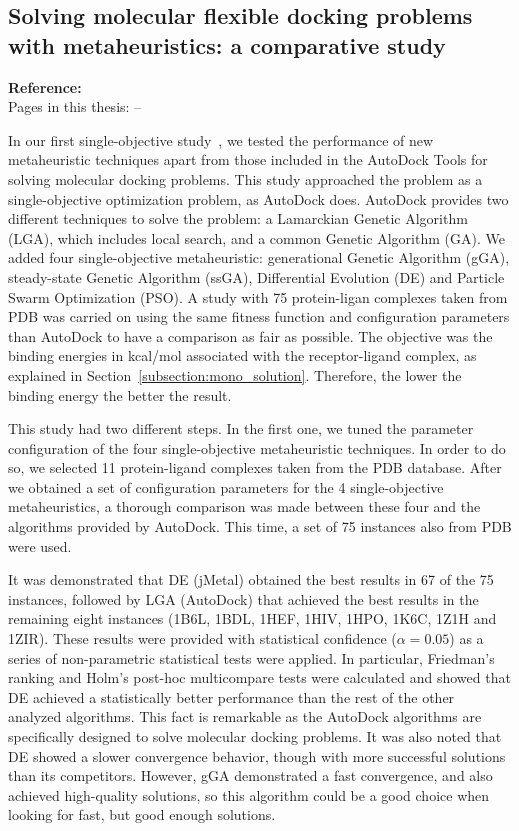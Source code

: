 \subsection{Solving molecular flexible docking problems with metaheuristics: a comparative study}

\textbf{Reference:}~\cite{lopez2015asoc} \\
Pages in this thesis: \pageref{start-pdf/asoc.pdf} -- \pageref{stop-pdf/asoc.pdf}

In our first single-objective study~\cite{lopez2015asoc}, we tested the performance of new metaheuristic techniques apart from those included in the AutoDock Tools for solving molecular docking problems. This study approached the problem as a single-objective optimization problem, as AutoDock does. AutoDock provides two different techniques to solve the problem: a Lamarckian Genetic Algorithm (LGA), which includes local search, and a common Genetic Algorithm (GA). We added four single-objective metaheuristic: generational Genetic Algorithm (gGA), steady-state Genetic Algorithm (ssGA), Differential Evolution (DE) and Particle Swarm Optimization (PSO). A study with 75 protein-ligan complexes taken from PDB was carried on using the same fitness function and configuration parameters than AutoDock to have a comparison as fair as possible. The objective was the binding energies in kcal/mol associated with the receptor-ligand complex, as explained in Section~\ref{subsection:mono_solution}. Therefore, the lower the binding energy the better the result.

This study had two different steps. In the first one, we tuned the parameter configuration of the four single-objective metaheuristic techniques. In order to do so, we selected 11 protein-ligand complexes taken from the PDB database. After we obtained a set of configuration parameters for the 4 single-objective metaheuristics, a thorough comparison was made between these four and the algorithms provided by AutoDock. This time, a set of 75 instances also from PDB were used.

It was demonstrated that DE (jMetal) obtained the best results in 67 of the 75 instances, followed by LGA (AutoDock) that achieved the best results in the remaining eight instances (1B6L, 1BDL, 1HEF, 1HIV, 1HPO, 1K6C, 1Z1H and 1ZIR). These results were provided with statistical confidence ($\alpha = 0.05$) as a series of non-parametric statistical tests were applied. In particular, Friedman's ranking and Holm's post-hoc multicompare tests were calculated and showed that DE achieved a statistically better performance than the rest of the other analyzed algorithms. This fact is remarkable as the AutoDock algorithms are specifically designed to solve molecular docking problems.
It was also noted that DE showed a slower convergence behavior, though with more successful solutions than its competitors. However, gGA demonstrated a fast convergence, and also achieved high-quality solutions, so this algorithm could be a good choice when looking for fast, but good enough solutions.

